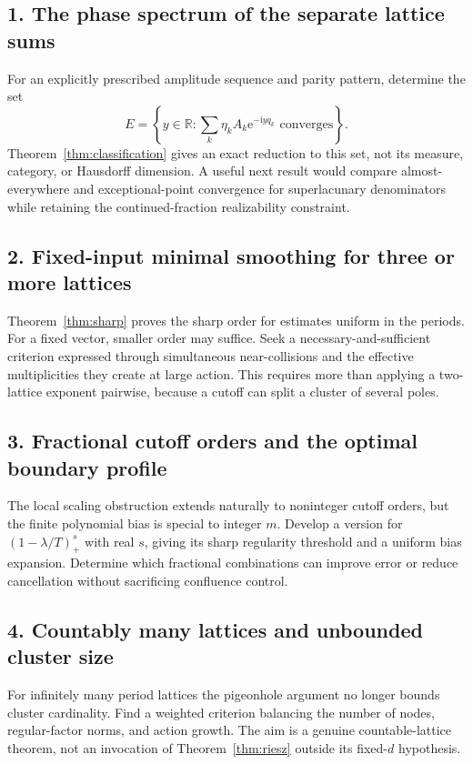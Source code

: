 \documentclass[11pt,a4paper]{article}
\numberwithin{equation}{section}
\theoremstyle{definition}
\theoremstyle{remark}
\newcommand{\R}{\mathbb R}
\newcommand{\e}{\mathrm e}
\newcommand{\ii}{\mathrm i}
\begin{document}
\subsection*{1. The phase spectrum of the separate lattice sums}
For an explicitly prescribed amplitude sequence and parity pattern,
determine the set
\[
 E=\left\{y\in\R:
       \sum_k\eta_kA_k\e^{-\ii yq_k}\text{ converges}\right\}.
\]
Theorem~\ref{thm:classification} gives an exact reduction to this set,
not its measure, category, or Hausdorff dimension. A useful next result
would compare almost-everywhere and exceptional-point convergence for
superlacunary denominators while retaining the continued-fraction
realizability constraint.

\subsection*{2. Fixed-input minimal smoothing for three or more lattices}
Theorem~\ref{thm:sharp} proves the sharp order for estimates uniform in
the periods. For a fixed vector, smaller order may suffice. Seek a
necessary-and-sufficient criterion expressed through simultaneous
near-collisions and the effective multiplicities they create at large
action. This requires more than applying a two-lattice exponent
pairwise, because a cutoff can split a cluster of several poles.

\subsection*{3. Fractional cutoff orders and the optimal boundary profile}
The local scaling obstruction extends naturally to noninteger cutoff
orders, but the finite polynomial bias is special to integer $m$.
Develop a version for $(1-\lambda/T)_+^s$ with real $s$, giving its
sharp regularity threshold and a uniform bias expansion. Determine
which fractional combinations can improve error or reduce cancellation
without sacrificing confluence control.

\subsection*{4. Countably many lattices and unbounded cluster size}
For infinitely many period lattices the pigeonhole argument no longer
bounds cluster cardinality. Find a weighted criterion balancing the
number of nodes, regular-factor norms, and action growth. The aim is
a genuine countable-lattice theorem, not an invocation of
Theorem~\ref{thm:riesz} outside its fixed-$d$ hypothesis.
\end{document}
